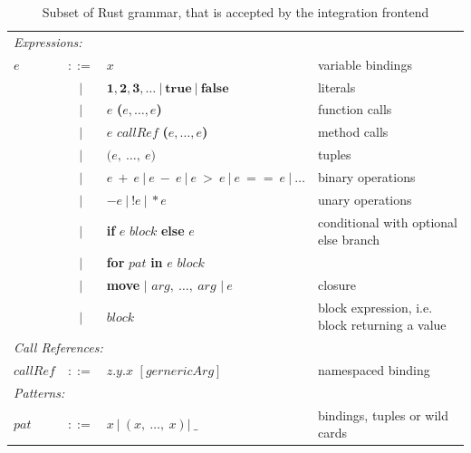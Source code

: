 \begin{table}[H]
{\begin{tabular}{l c l l}
        \multicolumn{4}{l}{\emph{Expressions:}}\\
        $e$ & $::=$ & $x$ & variable bindings \\
        & $|$ & $\textbf{1},\textbf{2},\textbf{3}, \ldots \ |\ \textbf{true}\ |\ \textbf{false}\ $  & literals \\
        & $|$ & $e$ \textbf{(}$e, \ldots , e$\textbf{)} & function calls \\
        & $|$ & $e$ $callRef$ \textbf{(}$e, \ldots , e$\textbf{)} & method calls \\
        & $|$ & $\textbf{(} e,~\ldots ,~e \textbf{)}\ $ & tuples\\
        & $|$ & $e\ +\ e\ |\ e\ -\ e \ |\ e\ > \ e\ |\ e\ == \ e\ |\ \ldots $ & binary operations \\
        & $|$ & $ -e\ |\ !e\ |\ *e\ $ & unary operations\\
        & $|$ &\textbf{if} $e$ $block$ \textbf{else} $e$& conditional with optional else branch \\
        & $|$ & \textbf{for} $pat$ \textbf{in} $e$ $block$ & \\ 
        & $|$ & \textbf{move} $\textbf{| } arg,~\ldots ,~arg \textbf{ |}\ e$ & closure\\
        &$|$& $block$ & block expression, i.e. block returning a value\\
        \multicolumn{4}{l}{\emph{Call References:}}\\
        $callRef $ & $::=$ & $ z\textbf{.}y\textbf{.}x$ $[gernericArg]$  & namespaced binding  \\
        \multicolumn{4}{l}{\emph{Patterns:}}\\
        $pat$ & $::=$ & $x\ |\ (x,~\ldots ,~x)|\ \_ $ & bindings, tuples or wild cards \\
    \end{tabular}%
    }
    \caption{Subset of Rust grammar, that is accepted by the integration frontend}
    \label{tab:FESubset}
\end{table}

